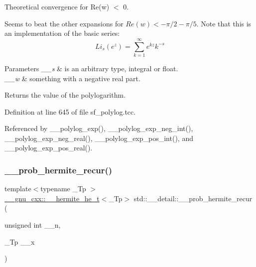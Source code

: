 Theoretical convergence for Re(w) $<$ 0.

Seems to beat the other expansions for $ Re(w) < -\pi/2 - \pi/5 $. Note that this is an implementation of the basic series\+: \[ Li_s(e^z) = \sum_{k=1}^{\infty} e^{kz} k^{-s} \]


\begin{DoxyParams}{Parameters}
{\em \+\_\+\+\_\+s} & is an arbitrary type, integral or float. \\
\hline
{\em \+\_\+\+\_\+w} & something with a negative real part. \\
\hline
\end{DoxyParams}
\begin{DoxyReturn}{Returns}
the value of the polylogarithm. 
\end{DoxyReturn}


Definition at line 645 of file sf\+\_\+polylog.\+tcc.



Referenced by \+\_\+\+\_\+polylog\+\_\+exp(), \+\_\+\+\_\+polylog\+\_\+exp\+\_\+neg\+\_\+int(), \+\_\+\+\_\+polylog\+\_\+exp\+\_\+neg\+\_\+real(), \+\_\+\+\_\+polylog\+\_\+exp\+\_\+pos\+\_\+int(), and \+\_\+\+\_\+polylog\+\_\+exp\+\_\+pos\+\_\+real().

\mbox{\label{namespacestd_1_1____detail_a15e668e86c18d01134aded2a1657b1b2}} 
\subsubsection{\texorpdfstring{\+\_\+\+\_\+prob\+\_\+hermite\+\_\+recur()}{\_\_prob\_hermite\_recur()}}
{\footnotesize\ttfamily template$<$typename \+\_\+\+Tp $>$ \\
\hyperlink{struct____gnu__cxx_1_1____hermite__he__t}{\+\_\+\+\_\+gnu\+\_\+cxx\+::\+\_\+\+\_\+hermite\+\_\+he\+\_\+t}$<$\+\_\+\+Tp$>$ std\+::\+\_\+\+\_\+detail\+::\+\_\+\+\_\+prob\+\_\+hermite\+\_\+recur (\begin{DoxyParamCaption}\item[{unsigned int}]{\+\_\+\+\_\+n,  }\item[{\+\_\+\+Tp}]{\+\_\+\+\_\+x }\end{DoxyParamCaption})}



